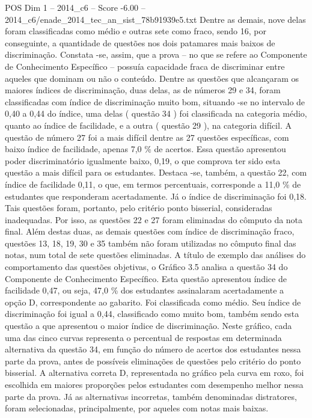 \begin{textsample}{POS Dim 1 – 2014\_c6 – Score -6.00 – 2014\_c6/enade\_2014\_tec\_an\_sist\_78b91939e5.txt}
Dentre as demais, nove delas foram classificadas como médio e outras sete como fraco, sendo 16, por conseguinte, a quantidade de questões nos dois patamares mais baixos de discriminação.
Constata -se, assim, que a prova – no que se refere ao Componente de Conhecimento Específico – possuía capacidade fraca de discriminar entre aqueles que dominam ou não o conteúdo.
Dentre as questões que alcançaram os maiores índices de discriminação, duas delas, as de números 29 e 34, foram classificadas com índice de discriminação muito bom, situando -se no intervalo de 0,40 a 0,44 do índice, uma delas ( questão 34 ) foi classificada na categoria médio, quanto ao índice de facilidade, e a outra ( questão 29 ), na categoria difícil.
A questão de número 27 foi a mais difícil dentre as 27 questões específicas, com baixo índice de facilidade, apenas 7,0 \% de acertos.
Essa questão apresentou poder discriminatório igualmente baixo, 0,19, o que comprova ter sido esta questão a mais difícil para os estudantes.
Destaca -se, também, a questão 22, com índice de facilidade 0,11, o que, em termos percentuais, corresponde a 11,0 \% de estudantes que responderam acertadamente.
Já o índice de discriminação foi 0,18.
Tais questões foram, portanto, pelo critério ponto bisserial, consideradas inadequadas.
Por isso, as questões 22 e 27 foram eliminadas do cômputo da nota final.
Além destas duas, as demais questões com índice de discriminação fraco, questões 13, 18, 19, 30 e 35 também não foram utilizadas no cômputo final das notas, num total de sete questões eliminadas.
A título de exemplo das análises do comportamento das questões objetivas, o Gráfico 3.5 analisa a questão 34 do Componente de Conhecimento Específico.
Esta questão apresentou índice de facilidade 0,47, ou seja, 47,0 \% dos estudantes assinalaram acertadamente a opção D, correspondente ao gabarito.
Foi classificada como médio.
Seu índice de discriminação foi igual a 0,44, classificado como muito bom, também sendo esta questão a que apresentou o maior índice de discriminação.
Neste gráfico, cada uma das cinco curvas representa o percentual de respostas em determinada alternativa da questão 34, em função do número de acertos dos estudantes nessa parte da prova, antes de possíveis eliminações de questões pelo critério do ponto bisserial.
A alternativa correta D, representada no gráfico pela curva em roxo, foi escolhida em maiores proporções pelos estudantes com desempenho melhor nessa parte da prova.
Já as alternativas incorretas, também denominadas distratores, foram selecionadas, principalmente, por aqueles com notas mais baixas.

\end{textsample}
